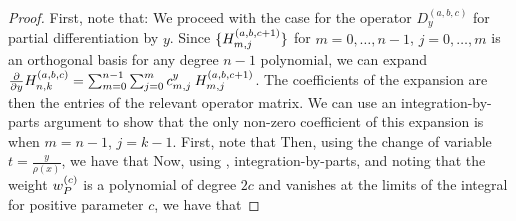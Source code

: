 \begin{proof}
First, note that:
We proceed with the case for the operator $D_y^{(a,b,c)}$ for partial differentiation by $y$. Since $\{H^{(a,b,c+1)}_{m,j}\}$ for $m = 0,\dots,n-1$, $j = 0,\dots,m$ is an orthogonal basis for any degree $n-1$ polynomial, we can expand ${\partial \over \partial y} H_{n,k}^{(a,b,c)} = \sum_{m=0}^{n-1} \sum_{j=0}^m c_{m,j}^y \: H^{(a, b, c+1)}_{m,j}$. The coefficients of the expansion are then the entries of the relevant operator matrix. We can use an integration-by-parts argument to show that the only non-zero coefficient of this expansion is when $m = n-1$, $j = k-1$. First, note that
Then, using the change of variable $t = \frac{y}{\rho(x)}$, we have that
Now, using , integration-by-parts, and noting that the weight $w_P^{(c)}$ is a polynomial of degree $2c$ and vanishes at the limits of the integral for positive parameter $c$, we have that
\end{proof}
